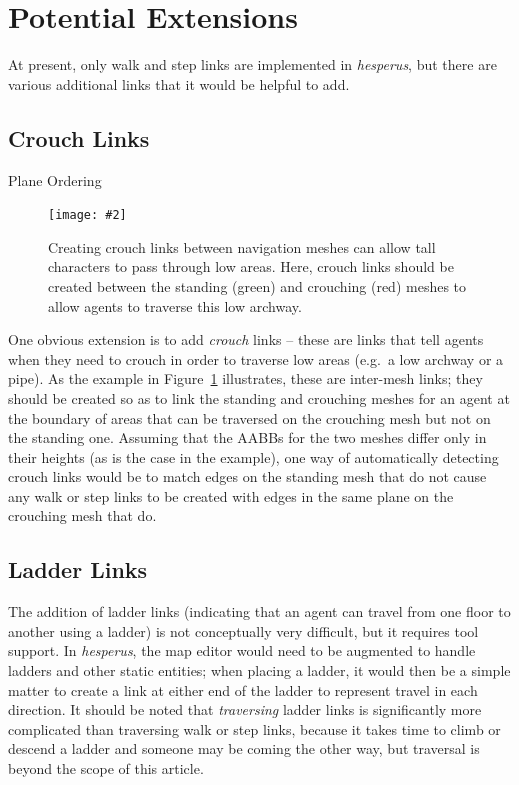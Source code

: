 \documentclass[10pt,twocolumn]{article}
\newcommand{\stufigex}[5]					%
{
	\begin{figure}[#5]
	\begin{center}
		\texttt{[image: \#2]}
		\caption{#3}
		\label{#4}
	\end{center}
	\end{figure}
}
\begin{document}

\section{Potential Extensions}

At present, only walk and step links are implemented in \emph{hesperus}, but there are various additional links that it would be helpful to add.

\subsection{Crouch Links}

\begin{stulisting}[!t]
\caption{Plane Ordering}
\label{code:plane-ordering}

\end{stulisting}

\stufigex{width=.9\linewidth}{crouchlinks.png}{Creating crouch links between navigation meshes can allow tall characters to pass through low areas. Here, crouch links should be created between the standing (green) and crouching (red) meshes to allow agents to traverse this low archway.}{fig:crouchlinks}{t}

One obvious extension is to add \emph{crouch} links -- these are links that tell agents when they need to crouch in order to traverse low areas (e.g.~a low archway or a pipe). As the example in Figure~\ref{fig:crouchlinks} illustrates, these are inter-mesh links; they should be created so as to link the standing and crouching meshes for an agent at the boundary of areas that can be traversed on the crouching mesh but not on the standing one. Assuming that the AABBs for the two meshes differ only in their heights (as is the case in the example), one way of automatically detecting crouch links would be to match edges on the standing mesh that do not cause any walk or step links to be created with edges in the same plane on the crouching mesh that do.

\subsection{Ladder Links}

The addition of ladder links (indicating that an agent can travel from one floor to another using a ladder) is not conceptually very difficult, but it requires tool support. In \emph{hesperus}, the map editor would need to be augmented to handle ladders and other static entities; when placing a ladder, it would then be a simple matter to create a link at either end of the ladder to represent travel in each direction. It should be noted that \emph{traversing} ladder links is significantly more complicated than traversing walk or step links, because it takes time to climb or descend a ladder and someone may be coming the other way, but traversal is beyond the scope of this article.
\end{document}
